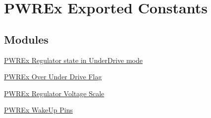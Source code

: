 \hypertarget{group___p_w_r_ex___exported___constants}{}\section{P\+W\+R\+Ex Exported Constants}
\label{group___p_w_r_ex___exported___constants}
\subsection*{Modules}
\begin{DoxyCompactItemize}
\item 
\hyperlink{group___p_w_r_ex___regulator__state__in___under_drive__mode}{P\+W\+R\+Ex Regulator state in Under\+Drive mode}
\item 
\hyperlink{group___p_w_r_ex___over___under___drive___flag}{P\+W\+R\+Ex Over Under Drive Flag}
\item 
\hyperlink{group___p_w_r_ex___regulator___voltage___scale}{P\+W\+R\+Ex Regulator Voltage Scale}
\item 
\hyperlink{group___p_w_r_ex___wake_up___pins}{P\+W\+R\+Ex Wake\+Up Pins}
\end{DoxyCompactItemize}
